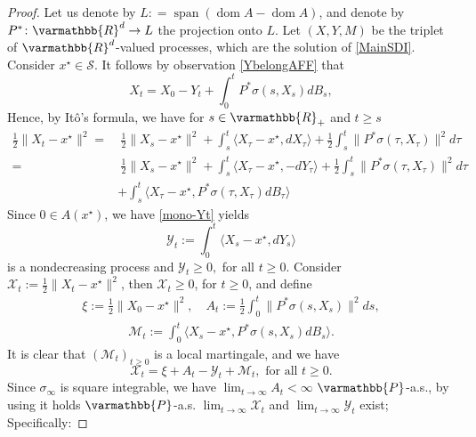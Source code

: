 \documentclass[11pt,reqno]{article}
\let\mathbb=\varmathbb
\newcommand{\R}{\mathbb{R}}
\newcommand{\dom}{\operatorname{dom}}
\newcommand{\1}{\mathds{1}}
\numberwithin{equation}{section}  %
\theoremstyle{plain}
\theoremstyle{definition}
\theoremstyle{remark}
\numberwithin{theorem}{section}
\numberwithin{remark}{section}
\numberwithin{example}{section}
\begin{document}
    \begin{proof}
Let us denote by $L: =\operatorname{span}(\dom A  - \dom A)$, and denote by $P^\ast \colon\mathbb{R}^d \to L$ the  projection onto $L$. Let  $(X,Y,M)$ be the triplet  of $\mathbb{R}^d$-valued processes, which are the solution of  \eqref{MainSDI}.   Consider $x^\star \in \mathcal{S}$. It follows by observation \eqref{YbelongAFF} that
    \begin{equation*}
    X_t = X_0-Y_t   + \int_0^t P^\ast\sigma(s,X_s) dB_s,  
    \end{equation*}
    Hence, by Itô's formula, we have for $s\in \R_+$ and $t\geq s$
    \begin{equation}\label{eqn-ito11}
        \begin{aligned}
            \frac{1}{2}\|X_t-x^\star\|^2 = & \ \frac{1}{2}\|X_s-x^\star\|^2 + \int_s^t \langle X_\tau-x^\star,dX_\tau\rangle + \frac{1}{2}\int_s^t\|P^\ast\sigma(\tau,X_\tau)\|^2 d\tau\\
             = & \ \frac{1}{2}\|X_s-x^\star\|^2 + \int_s^t \langle X_\tau-x^\star,-dY_\tau\rangle + \frac{1}{2}\int_s^t\|P^\ast\sigma(\tau,X_\tau)\|^2 d\tau \\
             & +\int_s^t \langle X_\tau-x^\star,P^\ast\sigma(\tau,X_\tau)dB_\tau\rangle
        \end{aligned}
    \end{equation}
    Since $0\in A(x^\star)$, we have \eqref{mono-Yt} yields
    \begin{equation*}
    	\mathcal{Y}_t:= \int_0^t\langle X_s-x^\star,dY_s \rangle
    \end{equation*}
    is a nondecreasing process and $\mathcal{Y}_t\geq 0, $  for all $ t\geq 0$. Consider   $\mathcal{X}_t := \frac{1}{2}\|X_t-x^\star\|^2$, then $\mathcal{X}_t\geq 0$, for  $t\geq 0$, and define 
    \begin{align*}
        \xi:=\frac{1}{2}\|X_0 - x^\star\|^2, \quad A_t :=  \frac{1}{2}\int_0^t\|P^\ast\sigma(s,X_s)\|^2ds, 
    \end{align*}
    \begin{align*}
        \mathscr{M}_t := \int_0^t \langle X_s-x^\star,P^\ast\sigma(s,X_s)dB_s\rangle. 
    \end{align*}
    It is clear that $(\mathscr{M}_t)_{t\geq 0}$ is a local martingale, and we have
    \begin{equation*}
       \mathcal{X}_t = \xi + A_t -\mathcal{Y}_t + \mathscr{M}_t, \text{ for all } t\geq 0.
    \end{equation*}
    Since $\sigma_\infty$ is square integrable, we have $\displaystyle\lim_{t\to \infty} A_t<\infty$ $\mathbb{P}$-a.s.,  by using \cite[Theorem 1.3.9]{MR2380366} it holds $\mathbb{P}$-a.s. $\displaystyle\lim_{t\to \infty} \mathcal{X}_t$ and $\displaystyle\lim_{t\to \infty} \mathcal{Y}_t$ exist; Specifically:

\end{proof}
\end{document}
